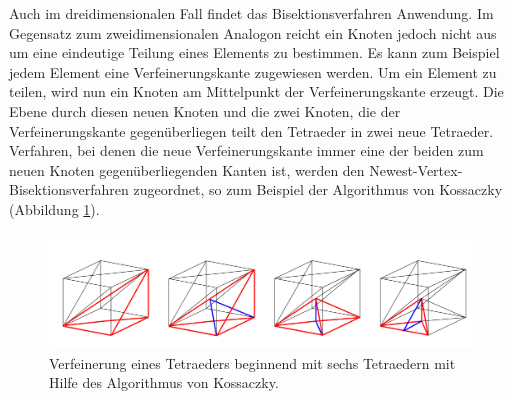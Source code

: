Auch im dreidimensionalen Fall findet das Bisektionsverfahren Anwendung. Im Gegensatz zum zweidimensionalen Analogon reicht ein Knoten jedoch nicht aus um eine eindeutige Teilung eines Elements zu bestimmen. Es kann zum Beispiel jedem Element eine Verfeinerungskante zugewiesen werden. Um ein Element zu teilen, wird nun ein Knoten am Mittelpunkt der Verfeinerungskante erzeugt. Die Ebene durch diesen neuen Knoten und die zwei Knoten, die der Verfeinerungskante gegenüberliegen teilt den Tetraeder in zwei neue Tetraeder. Verfahren, bei denen die neue Verfeinerungskante immer eine der beiden zum neuen Knoten gegenüberliegenden Kanten ist, werden den Newest-Vertex-Bisektionsverfahren zugeordnet, so zum Beispiel der Algorithmus von Kossaczky (Abbildung \ref{kos}).

\begin{figure}[!htbp]
\begin{center}
	\includegraphics[width=16cm]{pics/bisec3.png}
\end{center}
\caption{\label{kos}Verfeinerung eines Tetraeders beginnend mit sechs Tetraedern mit Hilfe des Algorithmus von Kossaczky.}
\end{figure}